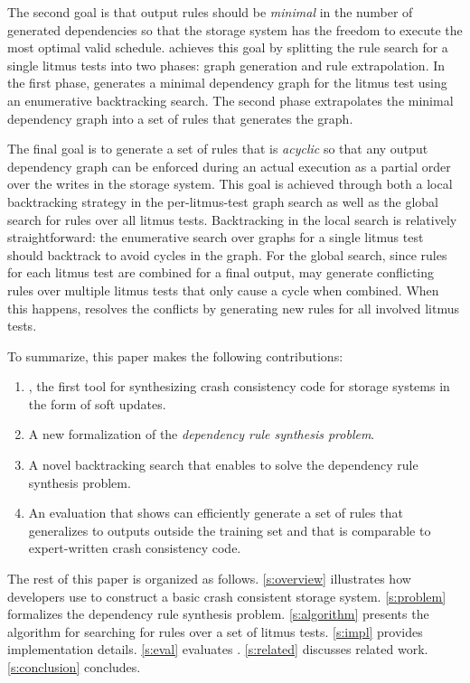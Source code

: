 The second goal is that output rules should be \textit{minimal} in the number of generated dependencies
so that the storage system has the freedom to execute the most optimal valid schedule. \depsynth achieves this
goal by splitting the rule search for a single litmus tests into two phases: graph generation and rule
extrapolation. In the first phase, \depsynth generates a minimal dependency graph for the litmus test
using an enumerative backtracking search. The second phase extrapolates the minimal dependency graph
into a set of rules that generates the graph.

The final goal is to generate a set of rules that is \textit{acyclic} so that any output dependency graph
can be enforced during an actual execution as a partial order over the writes in the storage system.
This goal is achieved through both a local backtracking strategy in the per-litmus-test graph search
as well as the global search for rules over all litmus tests. Backtracking in the local search is
relatively straightforward: the enumerative search over graphs for a single litmus test should backtrack
to avoid cycles in the graph. For the global search, since rules for each litmus test are combined for a
final output, \depsynth may
generate conflicting rules over multiple litmus tests that only cause a cycle when combined.
When this happens, \depsynth resolves the conflicts by generating new rules for all
involved litmus tests.

To summarize, this paper makes the following contributions:
\begin{enumerate}
  \item \depsynth, the first tool for synthesizing crash consistency code for storage systems
        in the form of soft updates.
  \item A new formalization of the \textit{dependency rule synthesis problem}. %
  \item A novel backtracking search that enables \depsynth to solve the dependency rule synthesis problem.
  \item An evaluation that shows \depsynth can efficiently generate a set of rules that generalizes
        to outputs outside the training set and that is comparable to expert-written crash consistency code.
\end{enumerate}

The rest of this paper is organized as follows.
\autoref{s:overview} illustrates how developers use \depsynth to construct a basic crash consistent storage system.
\autoref{s:problem} formalizes the dependency rule synthesis problem.
\autoref{s:algorithm} presents the \depsynth algorithm for searching for rules over a set of litmus tests.
\autoref{s:impl} provides implementation details.
\autoref{s:eval} evaluates \depsynth.
\autoref{s:related} discusses related work.
\autoref{s:conclusion} concludes.
\fi
